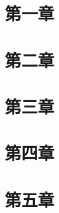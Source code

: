 \documentclass[lang=cn,10pt]{elegantbook}
\begin{document}
\begin{sloppypar} %

\section{第一章}
\section{第二章}
\section{第三章}
\section{第四章}

\newpage
\section{第五章}





\end{sloppypar}
\end{document}
